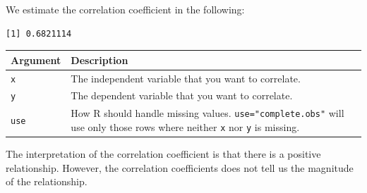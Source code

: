 \documentclass[]{article}
\newenvironment{Shaded}{\begin{snugshade}}{\end{snugshade}}
\newcommand{\DataTypeTok}[1]{\textcolor[rgb]{0.13,0.29,0.53}{#1}}
\newcommand{\KeywordTok}[1]{\textcolor[rgb]{0.13,0.29,0.53}{\textbf{#1}}}
\newcommand{\NormalTok}[1]{#1}
\newcommand{\OperatorTok}[1]{\textcolor[rgb]{0.81,0.36,0.00}{\textbf{#1}}}
\newcommand{\StringTok}[1]{\textcolor[rgb]{0.31,0.60,0.02}{#1}}
\begin{document}
We estimate the correlation coefficient in the following:

\begin{Shaded}
\end{Shaded}

\begin{verbatim}
[1] 0.6821114
\end{verbatim}

\begin{longtable}[]{@{}ll@{}}
\toprule
\begin{minipage}[b]{0.11\columnwidth}\raggedright
Argument\strut
\end{minipage} & \begin{minipage}[b]{0.83\columnwidth}\raggedright
Description\strut
\end{minipage}\tabularnewline
\midrule
\endhead
\begin{minipage}[t]{0.11\columnwidth}\raggedright
\texttt{x}\strut
\end{minipage} & \begin{minipage}[t]{0.83\columnwidth}\raggedright
The independent variable that you want to correlate.\strut
\end{minipage}\tabularnewline
\begin{minipage}[t]{0.11\columnwidth}\raggedright
\texttt{y}\strut
\end{minipage} & \begin{minipage}[t]{0.83\columnwidth}\raggedright
The dependent variable that you want to correlate.\strut
\end{minipage}\tabularnewline
\begin{minipage}[t]{0.11\columnwidth}\raggedright
\texttt{use}\strut
\end{minipage} & \begin{minipage}[t]{0.83\columnwidth}\raggedright
How R should handle missing values. \texttt{use="complete.obs"} will use only those rows where neither \texttt{x} nor \texttt{y} is missing.\strut
\end{minipage}\tabularnewline
\bottomrule
\end{longtable}

The interpretation of the correlation coefficient is that there is a positive relationship. However, the correlation coefficients does not tell us the magnitude of the relationship.
\end{document}
